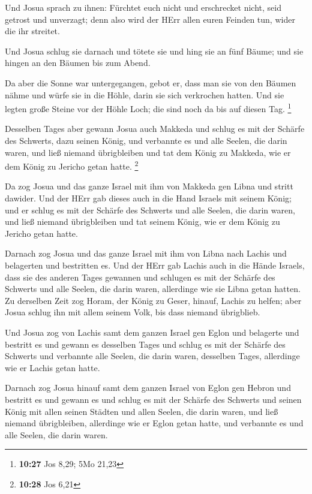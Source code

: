  Und Josua sprach zu ihnen: Fürchtet euch nicht und
erschrecket nicht, seid getrost und unverzagt; denn also wird der HErr
allen euren Feinden tun, wider die ihr streitet.

 Und Josua schlug sie darnach und tötete sie und hing sie
an fünf Bäume; und sie hingen an den Bäumen bis zum Abend.

 Da aber die Sonne war untergegangen, gebot er, dass man
sie von den Bäumen nähme und würfe sie in die Höhle, darin sie sich
verkrochen hatten. Und sie legten große Steine vor der Höhle Loch; die
sind noch da bis auf diesen Tag. \footnote{\textbf{10:27} Jos 8,29; 5Mo
  21,23}

 Desselben Tages aber gewann Josua auch Makkeda und schlug
es mit der Schärfe des Schwerts, dazu seinen König, und verbannte es und
alle Seelen, die darin waren, und ließ niemand übrigbleiben und tat dem
König zu Makkeda, wie er dem König zu Jericho getan hatte. \footnote{\textbf{10:28}
  Jos 6,21}

 Da zog Josua und das ganze Israel mit ihm von Makkeda gen
Libna und stritt dawider.  Und der HErr gab dieses auch in
die Hand Israels mit seinem König; und er schlug es mit der Schärfe des
Schwerts und alle Seelen, die darin waren, und ließ niemand übrigbleiben
und tat seinem König, wie er dem König zu Jericho getan hatte.

 Darnach zog Josua und das ganze Israel mit ihm von Libna
nach Lachis und belagerten und bestritten es.  Und der HErr
gab Lachis auch in die Hände Israels, dass sie des anderen Tages
gewannen und schlugen es mit der Schärfe des Schwerts und alle Seelen,
die darin waren, allerdinge wie sie Libna getan hatten.  Zu
derselben Zeit zog Horam, der König zu Geser, hinauf, Lachis zu helfen;
aber Josua schlug ihn mit allem seinem Volk, bis dass niemand
übrigblieb.

 Und Josua zog von Lachis samt dem ganzen Israel gen Eglon
und belagerte und bestritt es  und gewann es desselben
Tages und schlug es mit der Schärfe des Schwerts und verbannte alle
Seelen, die darin waren, desselben Tages, allerdinge wie er Lachis getan
hatte.

 Darnach zog Josua hinauf samt dem ganzen Israel von Eglon
gen Hebron und bestritt es  und gewann es und schlug es mit
der Schärfe des Schwerts und seinen König mit allen seinen Städten und
allen Seelen, die darin waren, und ließ niemand übrigbleiben, allerdinge
wie er Eglon getan hatte, und verbannte es und alle Seelen, die darin
waren.

